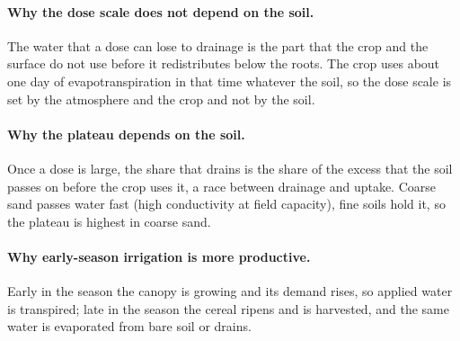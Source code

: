 \paragraph{Why the dose scale does not depend on the soil.} The water that a dose can lose to drainage is the part that the crop and the surface do not use before it redistributes below the roots. The crop uses about one day of evapotranspiration in that time whatever the soil, so the dose scale is set by the atmosphere and the crop and not by the soil.
\paragraph{Why the plateau depends on the soil.} Once a dose is large, the share that drains is the share of the excess that the soil passes on before the crop uses it, a race between drainage and uptake. Coarse sand passes water fast (high conductivity at field capacity), fine soils hold it, so the plateau is highest in coarse sand.
\paragraph{Why early-season irrigation is more productive.} Early in the season the canopy is growing and its demand rises, so applied water is transpired; late in the season the cereal ripens and is harvested, and the same water is evaporated from bare soil or drains.

